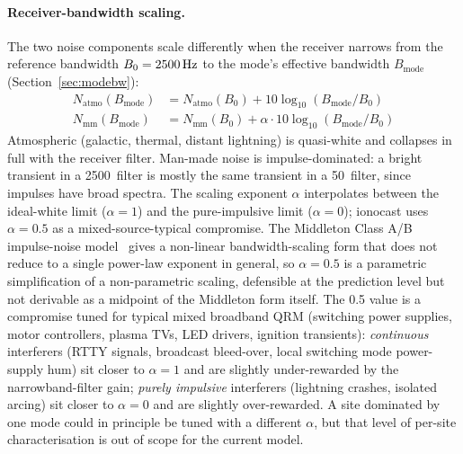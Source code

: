 \documentclass[11pt,a4paper]{article}
\newcommand{\SI}[2]{#1\,\text{#2}}
\newcommand{\Hz}{\text{Hz}}
\begin{document}
\paragraph{Receiver-bandwidth scaling.}
The two noise components scale differently when the receiver narrows
from the reference bandwidth $B_0 = \SI{2500}{\Hz}$ to the mode's
effective bandwidth $B_{\text{mode}}$ (Section~\ref{sec:modebw}):
\begin{align}
  N_{\text{atmo}}(B_{\text{mode}}) &= N_{\text{atmo}}(B_0) + 10\log_{10}(B_{\text{mode}}/B_0) \\
  N_{\text{mm}}(B_{\text{mode}})   &= N_{\text{mm}}(B_0)   + \alpha \cdot 10\log_{10}(B_{\text{mode}}/B_0)
\end{align}
Atmospheric (galactic, thermal, distant lightning) is quasi-white and
collapses in full with the receiver filter.  Man-made noise is
impulse-dominated: a bright transient in a \SI{2500}{\Hz} filter is
mostly the same transient in a \SI{50}{\Hz} filter, since impulses
have broad spectra.  The scaling exponent $\alpha$ interpolates
between the ideal-white limit ($\alpha = 1$) and the pure-impulsive
limit ($\alpha = 0$); ionocast uses $\alpha = 0.5$ as a
mixed-source-typical compromise.  The Middleton Class A/B
impulse-noise model~\cite{middleton1977} gives a non-linear
bandwidth-scaling form that does not reduce to a single
power-law exponent in general, so $\alpha = 0.5$ is a parametric
simplification of a non-parametric scaling, defensible at the
prediction level but not derivable as a midpoint of the Middleton
form itself.
The 0.5 value is a compromise tuned for typical mixed broadband
QRM (switching power supplies, motor controllers, plasma TVs,
LED drivers, ignition transients):
\emph{continuous} interferers (RTTY signals, broadcast bleed-over,
local switching mode power-supply hum) sit closer to $\alpha = 1$
and are slightly under-rewarded by the narrowband-filter gain;
\emph{purely impulsive} interferers (lightning crashes, isolated
arcing) sit closer to $\alpha = 0$ and are slightly over-rewarded.
A site dominated by one mode could in principle be tuned with a
different $\alpha$, but that level of per-site characterisation is
out of scope for the current model.
\end{document}
